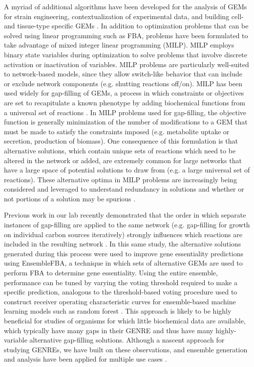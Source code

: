 \documentclass[11pt,onecolumn,notitlepage,openany,twoside]{book}
\begin{document}
\begin{refsection}
A myriad of additional algorithms have been developed for the analysis of GEMs for strain engineering, contextualization of experimental data, and building cell- and tissue-type specific GEMs \cite{Blazier2012-oo,Machado2014-wi,Wang2017-sp}. In addition to optimization problems that can be solved using linear programming such as FBA, problems have been formulated to take advantage of mixed integer linear programming (MILP). MILP employs binary state variables during optimization to solve problems that involve discrete activation or inactivation of variables. MILP problems are particularly well-suited to network-based models, since they allow switch-like behavior that can include or exclude network components (e.g. shutting reactions off/on). MILP has been used widely for gap-filling of GEMs, a process in which constraints or objectives are set to recapitulate a known phenotype by adding biochemical functions from a universal set of reactions \cite{Reed2006-qv}. In MILP problems used for gap-filling, the objective function is generally minimization of the number of modifications to a GEM that must be made to satisfy the constraints imposed (e.g. metabolite uptake or secretion, production of biomass). One consequence of this formulation is that alternative solutions, which contain unique sets of reactions which need to be altered in the network or added, are extremely common for large networks that have a large space of potential solutions to draw from (e.g. a large universal set of reactions). These alternative optima in MILP problems are increasingly being considered and leveraged to understand redundancy in solutions and whether or not portions of a solution may be spurious \cite{Karp2018-hd,Robaina-Estevez2017-fy,Rossell2013-cf}.

Previous work in our lab recently demonstrated that the order in which separate instances of gap-filling are applied to the same network (e.g. gap-filling for growth on individual carbon sources iteratively) strongly influences which reactions are included in the resulting network \cite{Biggs2017-md}. In this same study, the alternative solutions generated during this process were used to improve gene essentiality predictions using EnsembleFBA, a technique in which sets of alternative GEMs are used to perform FBA to determine gene essentiality. Using the entire ensemble, performance can be tuned by varying the voting threshold required to make a specific prediction, analogous to the threshold-based voting procedure used to construct receiver operating characteristic curves for ensemble-based machine learning models such as random forest \cite{Breiman2001-pl}. This approach is likely to be highly beneficial for studies of organisms for which little biochemical data are available, which typically have many gaps in their GENRE and thus have many highly-variable alternative gap-filling solutions. Although a nascent approach for studying GENREs, we have built on these observations, and ensemble generation and analysis have been applied for multiple use cases \cite{Machado2018-cz,Medlock2018-ub,Medlock2018-kx}.


\end{refsection}
\end{document}
